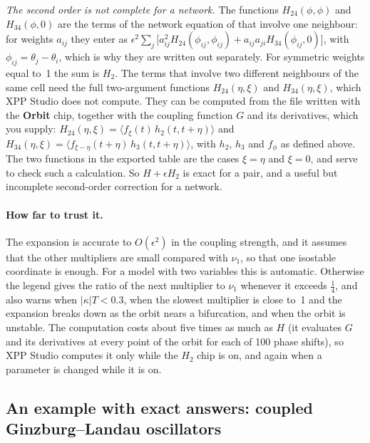 \documentclass[11pt,a4paper]{article}
\newcommand{\XS}{\textsf{XPP Studio}}
\newcommand{\ui}[1]{\textsf{\textbf{#1}}}          %
\begin{document}
\emph{The second order is not complete for a network.} The functions $H_{24}(\phi,\phi)$ and $H_{34}(\phi,0)$ are the terms of the network equation of \cite{wilson2019} that involve one neighbour: for weights $a_{ij}$ they enter as $\epsilon^2\sum_j\bigl[a_{ij}^2H_{24}(\phi_{ij},\phi_{ij})+a_{ij}a_{ji}H_{34}(\phi_{ij},0)\bigr]$, with $\phi_{ij}=\theta_j-\theta_i$, which is why they are written out separately. For symmetric weights equal to~1 the sum is $H_2$. The terms that involve two different neighbours of the same cell need the full two-argument functions $H_{24}(\eta,\xi)$ and $H_{34}(\eta,\xi)$, which \XS{} does not compute. They can be computed from the file written with the \ui{Orbit} chip, together with the coupling function $G$ and its derivatives, which you supply: $H_{24}(\eta,\xi)=\langle f_\xi(t)\,h_2(t,t+\eta)\rangle$ and $H_{34}(\eta,\xi)=\langle f_{\xi-\eta}(t+\eta)\,h_3(t,t+\eta)\rangle$, with $h_2$, $h_3$ and $f_\phi$ as defined above. The two functions in the exported table are the cases $\xi=\eta$ and $\xi=0$, and serve to check such a calculation. So $H+\epsilon H_2$ is exact for a pair, and a useful but incomplete second-order correction for a network.

\paragraph{How far to trust it.} The expansion is accurate to $O(\epsilon^2)$ in the coupling strength, and it assumes that the other multipliers are small compared with $\nu_1$, so that one isostable coordinate is enough. For a model with two variables this is automatic. Otherwise the legend gives the ratio of the next multiplier to $\nu_1$ whenever it exceeds $\tfrac14$, and also warns when $|\kappa|T<0.3$, when the slowest multiplier is close to~1 and the expansion breaks down as the orbit nears a bifurcation, and when the orbit is unstable. The computation costs about five times as much as $H$ (it evaluates $G$ and its derivatives at every point of the orbit for each of 100 phase shifts), so \XS{} computes it only while the $H_2$ chip is on, and again when a parameter is changed while it is on.

\subsection*{An example with exact answers: coupled Ginzburg--Landau oscillators}\label{sec:cgl}
\end{document}
